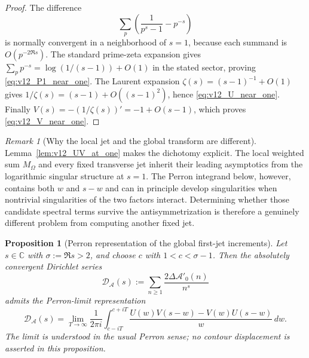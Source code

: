 \documentclass[11pt]{amsart}
\numberwithin{equation}{section}
\theoremstyle{plain}
\newtheorem{proposition}[theorem]{Proposition}
\theoremstyle{definition}
\theoremstyle{remark}
\newtheorem{remark}[theorem]{Remark}
\begin{document}
\begin{proof}
The difference
\begin{equation}
\sum_p\left(\frac1{p^s-1}-p^{-s}\right)
\label{eq:v12_P1_difference}
\end{equation}
is normally convergent in a neighborhood of \(s=1\), because each summand is
\(O(p^{-2\Re s})\).  The standard prime-zeta expansion gives
\(\sum_pp^{-s}=\log(1/(s-1))+O(1)\) in the stated sector, proving
\eqref{eq:v12_P1_near_one}.  The Laurent expansion
\(\zeta(s)=(s-1)^{-1}+O(1)\) gives
\(1/\zeta(s)=(s-1)+O((s-1)^2)\), hence
\eqref{eq:v12_U_near_one}.  Finally
\(V(s)=-(1/\zeta(s))'=-1+O(s-1)\), which proves
\eqref{eq:v12_V_near_one}.
\end{proof}

\begin{remark}[Why the local jet and the global transform are different]
\label{rem:v12_local_vs_global}
Lemma~\ref{lem:v12_UV_at_one} makes the dichotomy explicit.  The local
weighted sum \(M_\Omega\) and every fixed transverse jet inherit their
leading asymptotics from the logarithmic singular structure at \(s=1\).
The Perron integrand below, however, contains both \(w\) and \(s-w\) and can
in principle develop singularities when nontrivial singularities of the two
factors interact.  Determining whether those candidate spectral terms survive
the antisymmetrization is therefore a genuinely different problem from
computing another fixed jet.
\end{remark}

\begin{proposition}[Perron representation of the global first-jet increments]
\label{prop:v11_global_Perron}
Let \(s\in\mathbb C\) with \(\sigma:=\Re s>2\), and choose
\(c\) with \(1<c<\sigma-1\).  Then the absolutely convergent Dirichlet
series
\begin{equation}
\mathscr D_{\mathcal A}(s)
:=\sum_{n\ge1}\frac{2\Delta\mathcal A'_0(n)}{n^s}
\label{eq:v11_DA_definition}
\end{equation}
admits the Perron-limit representation
\begin{equation}
\boxed{
\mathscr D_{\mathcal A}(s)
=\lim_{T\to\infty}\frac1{2\pi i}
\int_{c-iT}^{c+iT}
\frac{U(w)V(s-w)-V(w)U(s-w)}{w}\,dw.}
\label{eq:v11_global_Perron}
\end{equation}
The limit is understood in the usual Perron sense; no contour displacement is
asserted in this proposition.
\end{proposition}
\end{document}
